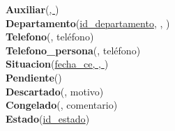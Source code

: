 \textbf{Auxiliar}(\underline{, })\\
\textbf{Departamento}(\underline{id\_departamento}, , )\\
\textbf{Telefono}(\underline{}, teléfono)\\
\textbf{Telefono\_persona}(\underline{}, teléfono)\\
\textbf{Situacion}(\underline{fecha\_ce, , })\\
\textbf{Pendiente}(\underline{})\\
\textbf{Descartado}(\underline{}, motivo)\\
\textbf{Congelado}(\underline{}, comentario)\\
\textbf{Estado}(\underline{id\_estado})\\

